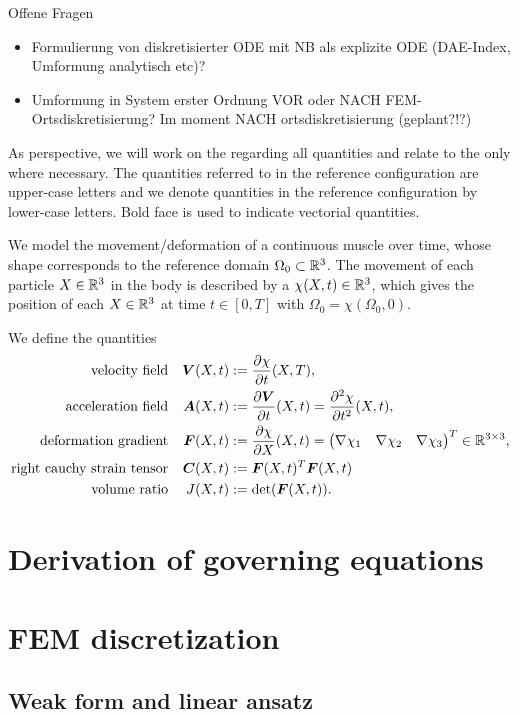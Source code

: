 \documentclass[a4paper,12pt]{article}
\newcommand{\Or}{\Omega_0}
\newcommand{\m}[1]{\ensuremath{\left(\begin{matrix}#1\end{matrix}\right)}}
\begin{document}
Offene Fragen
\begin{itemize}
  \item Formulierung von diskretisierter ODE mit NB als explizite ODE (DAE-Index, Umformung analytisch etc)?
  \item Umformung in System erster Ordnung VOR oder NACH FEM-Ortsdiskretisierung?
  Im moment NACH ortsdiskretisierung (geplant?!?)
\end{itemize}

As perspective, we will work on the  regarding all quantities and relate to the  only where necessary.
The quantities referred to in the reference configuration are upper-case letters and we denote quantities in the reference configuration by lower-case letters.
Bold face is used to indicate vectorial quantities.

We model the movement/deformation of a continuous muscle over time, whose shape corresponds to the reference domain $\Or\subset\R^3$.
The movement of each particle $X\in\mathbb{R}^3$ in the body is described by a  $\chi(X,t)\in\mathbb{R}^3$, which gives the position of each $X\in\mathbb{R}^3$ at time
$t\in[0,T]$ with $\Or = \chi(\Or,0)$.

We define the quantities
\begin{align}
	\text{velocity field} && \vV(X,t) &:= \d{\chi}{t}(X,T),\\
	\text{acceleration field} && \vA(X,t) &:= \d{\vV}{t}(X,t) = \dd{\chi}{t}(X,t),\\
	\text{deformation gradient} && \vF(X,t) &:= \d{\chi}{X}(X,t) = \m{\nabla \chi_1 & \nabla \chi_2 & \nabla \chi_3}^T \in \R^{3\times 3},\\
	\text{right cauchy strain tensor} && \vC(X,t) &:= \vF(X,t)^T\vF(X,t)\\
	\text{volume ratio} && J(X,t) &:= \det(\vF(X,t)).
\end{align}

\section{Derivation of governing equations}


\section{FEM discretization}

\subsection{Weak form and linear ansatz}

\end{document}
